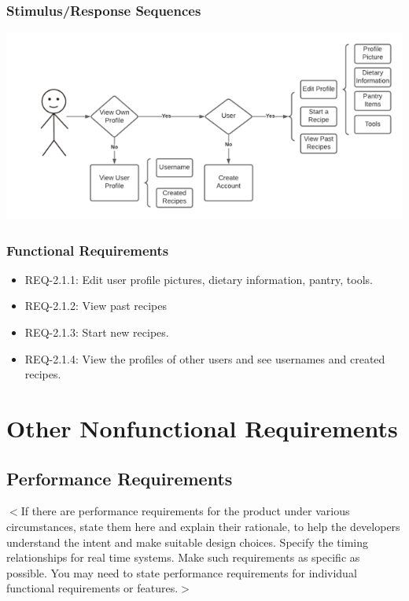 \documentclass{scrreprt}
\begin{document}
\subsection{Stimulus/Response Sequences}

\includegraphics{FlowCharts/Profile-Profile.png}

\subsection{Functional Requirements}

\begin{itemize}
    \item REQ-2.1.1: Edit user profile pictures, dietary information, pantry, tools.
    \item REQ-2.1.2: View past recipes 
    \item REQ-2.1.3: Start new recipes.
    \item REQ-2.1.4: View the profiles of other users and see usernames and created recipes.    
\end{itemize}

\chapter{Other Nonfunctional Requirements}

\section{Performance Requirements}
$<$If there are performance requirements for the product under various 
circumstances, state them here and explain their rationale, to help the 
developers understand the intent and make suitable design choices. Specify the 
timing relationships for real time systems. Make such requirements as specific 
as possible. You may need to state performance requirements for individual 
functional requirements or features.$>$
\end{document}
